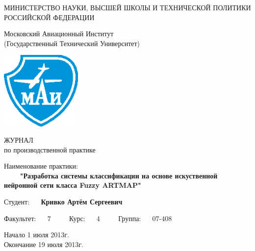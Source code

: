 \begin{titlepage}
\newpage

\begin{center}
	МИНИСТЕРСТВО НАУКИ, ВЫСШЕЙ ШКОЛЫ И ТЕХНИЧЕСКОЙ ПОЛИТИКИ \\
	РОССИЙСКОЙ ФЕДЕРАЦИИ
\end{center}


\begin{center}
	Московский Авиационный Институт\\
	(Государственный Технический Университет)
\end{center}

\vspace{2em}

\begin{center}
	\includegraphics[width=4cm]{mai.eps}
\end{center}

\begin{center}
	\large ЖУРНАЛ\\
	\large по производственной практике
\end{center}

\vspace{2em}


\begin{flushleft}
	Наименование практики: \\
	$\qquad$ \textbf{"Разработка системы классификации на основе искуственной нейронной сети класса Fuzzy ARTMAP"}
\end{flushleft}

\vspace{2em}

\begin{flushleft}
	Студент: $\quad$ \textbf{Кривко Артём Сергеевич}
\end{flushleft}

\vspace{2em}


\begin{flushleft}
	Факультет: $\quad$ 7 $\qquad$	Курс: $\quad$ 4 $\qquad$	Группа: $\quad$ 07-408 
\end{flushleft}


\vspace{4em}

\begin{center}
Начало 1 июля 2013г.\\
Окончание 19 июля 2013г.
\end{center}

\vspace{\fill}


\end{titlepage}
